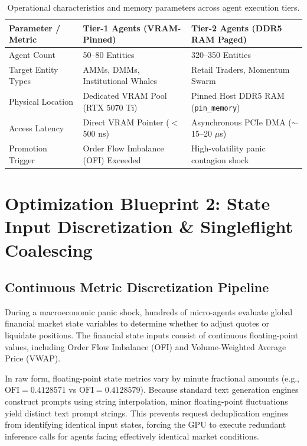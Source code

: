 \begin{table}[htbp]
\centering
\small
\begin{tabularx}{\textwidth}{l X X}
\toprule
\textbf{Parameter / Metric} & \textbf{Tier-1 Agents (VRAM-Pinned)} & \textbf{Tier-2 Agents (DDR5 RAM Paged)} \\
\midrule
Agent Count & 50--80 Entities & 320--350 Entities \\
Target Entity Types & AMMs, DMMs, Institutional Whales & Retail Traders, Momentum Swarm \\
Physical Location & Dedicated VRAM Pool (RTX 5070 Ti) & Pinned Host DDR5 RAM (\texttt{pin\_memory}) \\
Access Latency & Direct VRAM Pointer ($<$ 500 ns) & Asynchronous PCIe DMA ($\sim$15--20 $\mu$s) \\
Promotion Trigger & Order Flow Imbalance (OFI) Exceeded & High-volatility panic contagion shock \\
\bottomrule
\end{tabularx}
\caption{Operational characteristics and memory parameters across agent execution tiers.}
\label{tab:agent_execution_tiers}
\end{table}

\section{Optimization Blueprint 2: State Input Discretization \& Singleflight Coalescing}

\subsection{Continuous Metric Discretization Pipeline}

During a macroeconomic panic shock, hundreds of micro-agents evaluate global financial market state variables to determine whether to adjust quotes or liquidate positions. The financial state inputs consist of continuous floating-point values, including Order Flow Imbalance (OFI) and Volume-Weighted Average Price (VWAP).

In raw form, floating-point state metrics vary by minute fractional amounts (e.g., $\text{OFI} = 0.4128571$ vs $\text{OFI} = 0.4128579$). Because standard text generation engines construct prompts using string interpolation, minor floating-point fluctuations yield distinct text prompt strings. This prevents request deduplication engines from identifying identical input states, forcing the GPU to execute redundant inference calls for agents facing effectively identical market conditions.

